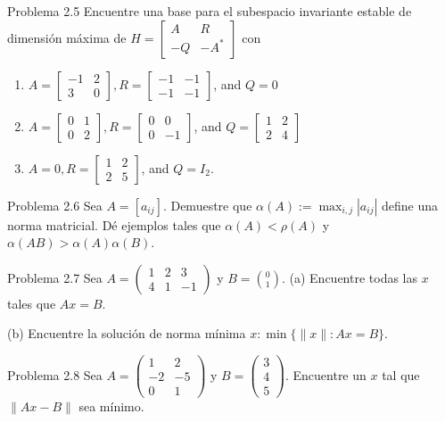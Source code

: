 Problema 2.5 Encuentre una base para el subespacio invariante estable de dimensión máxima de $H=\left[\begin{array}{cc}A & R \\ -Q & -A^{*}\end{array}\right]$ con

\begin{enumerate}
  \item $A=\left[\begin{array}{cc}-1 & 2 \\ 3 & 0\end{array}\right], R=\left[\begin{array}{cc}-1 & -1 \\ -1 & -1\end{array}\right]$, and $Q=0$
  \item $A=\left[\begin{array}{ll}0 & 1 \\ 0 & 2\end{array}\right], R=\left[\begin{array}{cc}0 & 0 \\ 0 & -1\end{array}\right]$, and $Q=\left[\begin{array}{ll}1 & 2 \\ 2 & 4\end{array}\right]$
  \item $A=0, R=\left[\begin{array}{ll}1 & 2 \\ 2 & 5\end{array}\right]$, and $Q=I_{2}$.
\end{enumerate}

Problema 2.6 Sea $A=\left[a_{i j}\right]$. Demuestre que $\alpha(A):=\max _{i, j}\left|a_{i j}\right|$ define una norma matricial. Dé ejemplos tales que $\alpha(A)<\rho(A)$ y $\alpha(A B)>\alpha(A) \alpha(B)$.

Problema 2.7 Sea $A=\left(\begin{array}{ccc}1 & 2 & 3 \\ 4 & 1 & -1\end{array}\right)$ y $B=\binom{0}{1}$. (a) Encuentre todas las $x$ tales que $A x=B$.

(b) Encuentre la solución de norma mínima $x: \min \{\|x\|: A x=B\}$.

Problema 2.8 Sea $A=\left(\begin{array}{cc}1 & 2 \\ -2 & -5 \\ 0 & 1\end{array}\right)$ y $B=\left(\begin{array}{l}3 \\ 4 \\ 5\end{array}\right)$. Encuentre un $x$ tal que $\|A x-B\|$ sea mínimo.

